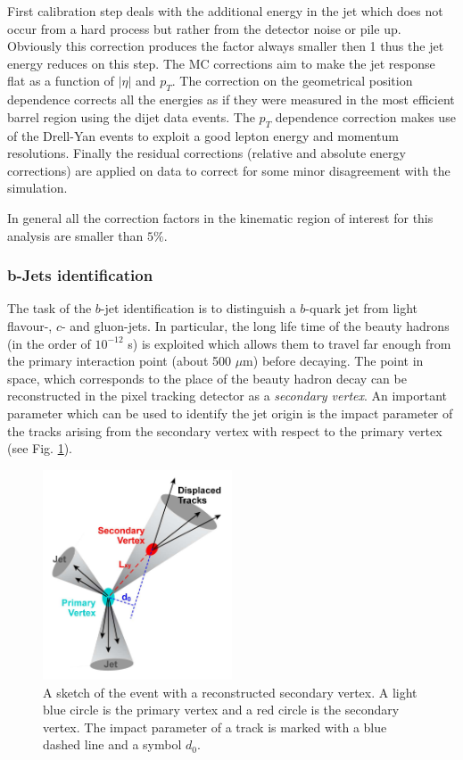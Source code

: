First calibration step deals with the additional energy in the jet which does not occur from a hard process but rather from the detector noise or pile up. 
Obviously this correction produces the factor always smaller then 1 thus the jet energy reduces on this step. The MC corrections aim to make the jet response
flat as a function of $|\eta|$ and $p_{T}$. The correction on the geometrical position dependence corrects all the energies as if they were measured 
in the most efficient barrel region using the dijet data events. The $p_{T}$ dependence correction makes use of the Drell-Yan events to exploit a good
lepton energy and momentum resolutions. Finally the residual corrections (relative and absolute energy corrections) are applied on data to correct for 
some minor disagreement with the simulation.

In general all the correction factors in the kinematic region of interest for this analysis are smaller than $5\%$.

\subsubsection{b-Jets identification}\label{ssec:bTag}

The task of the $b$-jet identification is to distinguish a $b$-quark jet from light flavour-, $c$- and gluon-jets. In particular,
the long life time of the beauty hadrons (in the order of $10^{-12}$ s) is exploited which allows them to travel far enough from the primary interaction point 
(about 500 $\mu$m) before decaying. The point in space, which corresponds to the place of the beauty hadron decay can be reconstructed in the pixel tracking 
detector as a \textit{secondary vertex}. An important parameter which can be used to identify the jet origin is the impact parameter of the tracks arising 
from the secondary vertex with respect to the primary vertex (see Fig. \ref{fig:SV}).

\begin{figure}[t]
  \centering
  \includegraphics[width=0.5\textwidth]{04_event_reconstruction/plots/btagging_cartoon.png}
  \caption{A sketch of the event with a reconstructed secondary vertex. A light blue circle is the primary vertex and a red circle is the secondary vertex. The impact 
  parameter of a track is marked with a blue dashed line and a symbol $d_{0}$.}
  \label{fig:SV}
\end{figure}

